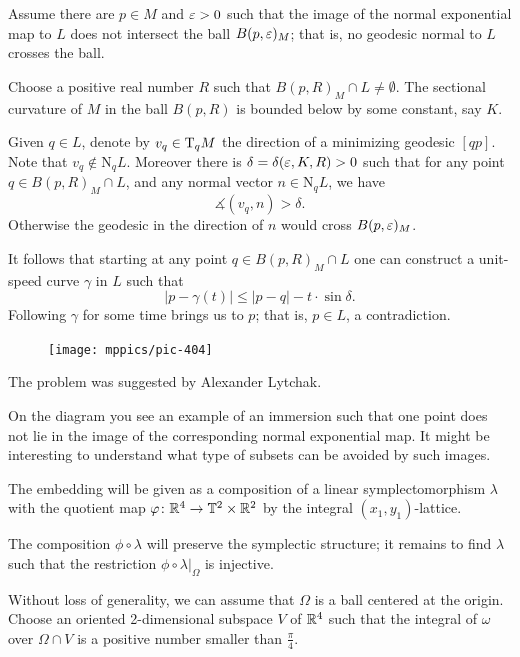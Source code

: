  
Assume there are $p\in M$ and $\varepsilon>0$ 
such that the image of the normal exponential map to $L$
 does not intersect the ball $B(p,\varepsilon)_M$; that is, no geodesic normal to $L$ crosses the ball.

Choose a positive real number $R$ such that $B(p,R)_M\cap L\ne \emptyset$.
The sectional curvature of $M$ in the ball $B(p,R)$
is bounded below by some constant, say $K$.

Given $q\in L$, denote by $v_q \in \mathrm{T}_qM$ the direction of a minimizing geodesic $[qp]$.
Note that $v_q\notin \mathrm{N}_qL$.
Moreover there is $\delta=\delta(\eps,K,R)\z>0$ 
such that for any point $q\in B(p,R)_M\cap L$,
and any normal vector $n\in \mathrm{N}_qL$,
we have 
\[\measuredangle (v_q,n)>\delta.\]
Otherwise the geodesic in the direction of $n$ would cross $B(p,\varepsilon)_M$.

It follows that starting at any point $q\in B(p,R)_M\cap L$ 
one can construct a unit-speed curve $\gamma$ in $L$ such that 
\[|p-\gamma(t)|\le |p-q|-t\cdot\sin \delta.\]
Following $\gamma$ for some time brings us to $p$;
that is, $p\in L$, a contradiction.
\qeds

{

\begin{figure}
\vskip-4mm
\centering
\texttt{[image: mppics/pic-404]}
\end{figure}

The problem was suggested by Alexander Lytchak.

On the diagram you see an example of an immersion 
such that one point does not lie in the image of the corresponding normal exponential map.
It might be interesting to understand what type of subsets can be avoided by such images.

}
The embedding will be given as a composition of a linear symplectomorphism $\lambda$ 
with the quotient map $\varphi\colon\mathbb{R}^4\to \mathbb{T}^2\times\mathbb{R}^2$ by the integral $(x_1,y_1)$-lattice.

\medskip

The composition $\phi\circ\lambda$ will preserve the symplectic structure;
it remains to find $\lambda$ such that the restriction $\phi\circ\lambda|_\Omega$
is injective.

Without loss of generality,
we can assume that $\Omega$ is a ball centered at the origin.
Choose an oriented 2-dimensional subspace $V$ of $\mathbb{R}^4$ 
such that the integral of $\omega$ over 
$\Omega\cap V$ is a  positive number smaller than $\tfrac\pi4$. 

